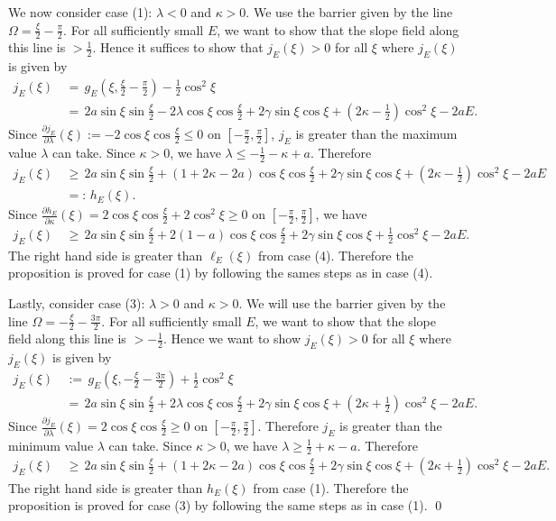 \documentclass[11 pt]{article}
\renewcommand\l{\lambda}
\renewcommand\({\left(}
\renewcommand\){\right)}
\newcommand\<{\langle}
\renewcommand\>{\rangle}
\renewcommand\l{\lambda}
\newcommand\8{\infty}
\newcommand{\pd}{\partial}
\begin{document}
We now consider case (1): $\l < 0$ and $\kappa > 0$. We  use the barrier given by the line $\Omega = \frac{\xi}{2} - \frac{\pi}{2}$. For all sufficiently small $E$, we want to show that the slope field along this line is $> \frac{1}{2}$. Hence it suffices to show that $j_E(\xi) > 0$ for all $\xi$ where $j_E(\xi)$ is given by 
\begin{align*}
j_{E}(\xi) \,&=\, g_E\left(\xi, \frac{\xi}{2} - \frac{\pi}{2}\right) - \frac{1}{2}\cos^2\xi
\\
&=\, 2a\sin\xi\sin\frac{\xi}{2} -2\l\cos\xi\cos\frac{\xi}{2} + 2\gamma \sin \xi \cos \xi + (2\kappa - \frac{1}{2})\cos^2\xi - 2aE.
\end{align*}
 Since $\frac{\pd j_E}{\pd \l}(\xi) := -2\cos \xi \cos \frac{\xi}{2} \leq 0$ on $[-\frac{\pi}{2}, \frac{\pi}{2}]$, $j_E$ is greater than the maximum value $\lambda$ can take. Since $\kappa > 0$, we have $\lambda \leq -\frac{1}{2} - \kappa +a $. Therefore
\begin{align*}
j_{E}(\xi) \,&\geq\, 2a\sin\xi\sin \frac{\xi}{2} + (1 + 2\kappa -2a)\cos\xi\cos\frac{\xi}{2} + 2\gamma\sin\xi\cos\xi +(2\kappa-\frac{1}{2})\cos^2\xi -2aE
\\
&=:\, h_{E}(\xi). 
\end{align*}
Since $\frac{\pd h_{E}}{\pd \kappa}(\xi) = 2\cos \xi \cos\frac{\xi}{2} + 2\cos^2\xi \geq 0$ on $[-\frac{\pi}{2}, \frac{\pi}{2}]$, we have
\begin{align*}
j_E(\xi) \,&\geq\, 2a\sin\xi\sin\frac{\xi}{2} + 2(1-a)\cos\xi\cos\frac{\xi}{2} + 2\gamma \sin \xi \cos \xi + \frac{1}{2}\cos^2\xi- 2aE.
\end{align*}
The right hand side is greater than $\ell_E(\xi)$ from case (4). Therefore the proposition is proved for case (1) by following the sames steps as in case (4). 
 

Lastly, consider case (3): $\l > 0$ and $\kappa > 0$. We will use the barrier given by the line $\Omega = -\frac{\xi}{2} - \frac{3\pi}{2}$. For all sufficiently small $E$, we want to show that the slope field along this line is $> -\frac{1}{2}$. Hence we want to show $j_E(\xi) > 0$ for all $\xi$ where $j_E(\xi)$ is given by 
\begin{align*}
j_E(\xi) \,&:=\, g_E\left(\xi, -\frac{\xi}{2} - \frac{3\pi}{2}\right) + \frac{1}{2}\cos^2\xi
\\
&=\, 2a\sin\xi \sin \frac{\xi}{2} + 2\l \cos \xi \cos \frac{\xi}{2} + 2\gamma\sin \xi \cos\xi + (2\kappa + \frac{1}{2})\cos^2\xi -2aE.
\end{align*}
Since $\frac{\pd j_E}{\pd \l}(\xi) = 2\cos \xi \cos \frac{\xi}{2} \geq 0$ on $[-\frac{\pi}{2}, \frac{\pi}{2}]$. Therefore $j_E$ is greater than the minimum value $\l$ can take. Since $\kappa > 0$, we have $\l \geq \frac{1}{2} + \kappa - a$. Therefore 
\begin{align*}
j_E(\xi) \,&\geq\, 2a\sin \xi \sin \frac{\xi}{2} + (1 + 2\kappa - 2a) \cos \xi \cos \frac{\xi}{2} + 2\gamma \sin \xi \cos \xi + (2\kappa + \frac{1}{2})\cos^2 \xi - 2aE.
\end{align*}
The right hand side is greater than $h_E(\xi)$ from case (1). Therefore the proposition is proved for case (3) by following the same steps as in case (1). \qed
\end{document}
